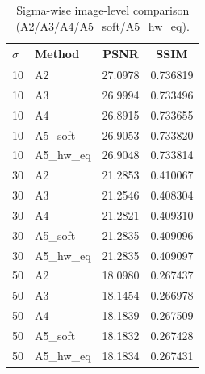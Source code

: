 \begin{table}[t]
\centering
\caption{Sigma-wise image-level comparison (A2/A3/A4/A5\_soft/A5\_hw\_eq).}
\label{tab:sigma_image}
\setlength{\tabcolsep}{4pt}
\begin{tabular}{llcc}
\toprule
$\sigma$ & Method & PSNR & SSIM \\
\midrule
10 & A2 & 27.0978 & 0.736819 \\
10 & A3 & 26.9994 & 0.733496 \\
10 & A4 & 26.8915 & 0.733655 \\
10 & A5\_soft & 26.9053 & 0.733820 \\
10 & A5\_hw\_eq & 26.9048 & 0.733814 \\
30 & A2 & 21.2853 & 0.410067 \\
30 & A3 & 21.2546 & 0.408304 \\
30 & A4 & 21.2821 & 0.409310 \\
30 & A5\_soft & 21.2835 & 0.409096 \\
30 & A5\_hw\_eq & 21.2835 & 0.409097 \\
50 & A2 & 18.0980 & 0.267437 \\
50 & A3 & 18.1454 & 0.266978 \\
50 & A4 & 18.1839 & 0.267509 \\
50 & A5\_soft & 18.1832 & 0.267428 \\
50 & A5\_hw\_eq & 18.1834 & 0.267431 \\
\bottomrule
\end{tabular}
\end{table}
